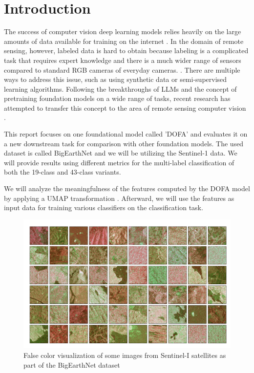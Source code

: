 \section{Introduction}
\label{sec:intro}

The success of computer vision deep learning models relies heavily on the large amounts of data available for training on the internet \cite{8237359}.
In the domain of remote sensing, however, labeled data is hard to obtain because labeling is a complicated task that requires expert knowledge and there is a much wider range of sensors compared to standard RGB cameras of everyday cameras. \cite{dofa}.
There are multiple ways to address this issue, such as using synthetic data or semi-supervised learning algorithms. Following the breakthroughs of LLMs and the concept of pretraining foundation models on a wide range of tasks, recent research has attempted to transfer this concept to the area of remote sensing computer vision \cite{bommasani2022opportunitiesrisksfoundationmodels}.

This report focuses on one foundational model called 'DOFA' \cite{dofa}
and evaluates it on a new downstream task for comparison with other foundation models. The used dataset is called BigEarthNet \cite{bigearthnet}
and we will be utilizing the Sentinel-1 data. We will provide results using different metrics for the multi-label classification of both the 19-class and 43-class variants.

We will analyze the meaningfulness of the features computed by the DOFA model by applying a UMAP transformation \cite{umap-paper}. Afterward, we will use the features as input data for training various classifiers on the classification task.


\begin{figure}[h]
	\centering
	\includegraphics[width=\columnwidth]{images/example-images.png}
	\caption{False color visualization of some images from Sentinel-I satellites as part of the BigEarthNet dataset \cite{bigearthnet}}
	\label{fig:example-image}
\end{figure}